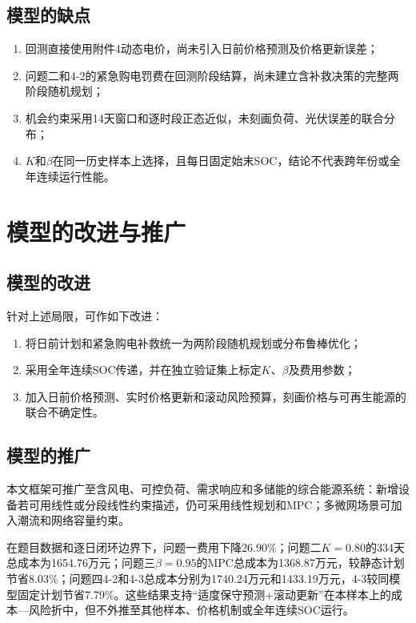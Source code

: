 \documentclass{cumcmthesis}
\begin{document}
\subsection{模型的缺点}

\begin{enumerate}
    \item 回测直接使用附件4动态电价，尚未引入日前价格预测及价格更新误差；
    \item 问题二和4-2的紧急购电罚费在回测阶段结算，尚未建立含补救决策的完整两阶段随机规划；
    \item 机会约束采用14天窗口和逐时段正态近似，未刻画负荷、光伏误差的联合分布；
    \item $K$和$\beta$在同一历史样本上选择，且每日固定始末SOC，结论不代表跨年份或全年连续运行性能。
\end{enumerate}

\section{模型的改进与推广}

\subsection{模型的改进}

针对上述局限，可作如下改进：
\begin{enumerate}
    \item 将日前计划和紧急购电补救统一为两阶段随机规划或分布鲁棒优化；
    \item 采用全年连续SOC传递，并在独立验证集上标定$K$、$\beta$及费用参数；
    \item 加入日前价格预测、实时价格更新和滚动风险预算，刻画价格与可再生能源的联合不确定性。
\end{enumerate}

\subsection{模型的推广}

本文框架可推广至含风电、可控负荷、需求响应和多储能的综合能源系统：新增设备若可用线性或分段线性约束描述，仍可采用线性规划和MPC；多微网场景可加入潮流和网络容量约束。

在题目数据和逐日闭环边界下，问题一费用下降26.90\%；问题二$K=0.80$的334天总成本为1654.76万元；问题三$\beta=0.95$的MPC总成本为1368.87万元，较静态计划节省8.03\%；问题四4-2和4-3总成本分别为1740.24万元和1433.19万元，4-3较同模型固定计划节省7.79\%。这些结果支持“适度保守预测+滚动更新”在本样本上的成本—风险折中，但不外推至其他样本、价格机制或全年连续SOC运行。
\end{document}

